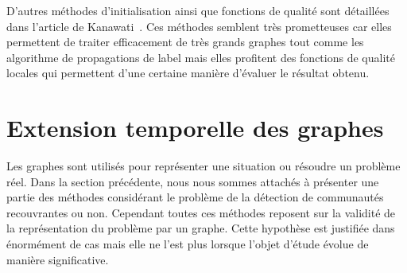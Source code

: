 D'autres méthodes d'initialisation ainsi que fonctions de qualité sont détaillées dans l'article de Kanawati~\cite{Kanawati2014}.
Ces méthodes semblent très prometteuses car elles permettent de traiter efficacement de très grands graphes tout comme les algorithme de propagations de label mais elles profitent des fonctions de qualité locales qui permettent d'une certaine manière d'évaluer le résultat obtenu.





\section{Extension temporelle des graphes}
\label{sec:intro_extension_temporelle}

Les graphes sont utilisés pour représenter une situation ou résoudre un problème réel.
Dans la section précédente, nous nous sommes attachés à présenter une partie des méthodes considérant le problème de la détection de communautés recouvrantes ou non.
Cependant toutes ces méthodes reposent sur la validité de la représentation du problème par un graphe.
Cette hypothèse est justifiée dans énormément de cas mais elle ne l'est plus lorsque l'objet d'étude évolue de manière significative.


